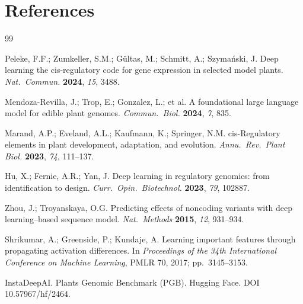 \documentclass[11pt,a4paper]{article}
\begin{document}
\section*{References}
\begin{thebibliography}{99}
\small
\setlength{\itemsep}{2pt}

Peleke, F.F.; Zumkeller, S.M.; G\"ultas, M.; Schmitt, A.; Szyma\'nski, J. Deep learning the cis-regulatory code for gene expression in selected model plants. \emph{Nat.\ Commun.} \textbf{2024}, \emph{15}, 3488.

Mendoza-Revilla, J.; Trop, E.; Gonzalez, L.; et al. A foundational large language model for edible plant genomes. \emph{Commun.\ Biol.} \textbf{2024}, \emph{7}, 835.

Marand, A.P.; Eveland, A.L.; Kaufmann, K.; Springer, N.M. cis-Regulatory elements in plant development, adaptation, and evolution. \emph{Annu.\ Rev.\ Plant Biol.} \textbf{2023}, \emph{74}, 111--137.

Hu, X.; Fernie, A.R.; Yan, J. Deep learning in regulatory genomics: from identification to design. \emph{Curr.\ Opin.\ Biotechnol.} \textbf{2023}, \emph{79}, 102887.

Zhou, J.; Troyanskaya, O.G. Predicting effects of noncoding variants with deep learning--based sequence model. \emph{Nat.\ Methods} \textbf{2015}, \emph{12}, 931--934.

Shrikumar, A.; Greenside, P.; Kundaje, A. Learning important features through propagating activation differences. In \emph{Proceedings of the 34th International Conference on Machine Learning}, PMLR 70, 2017; pp.\ 3145--3153.

InstaDeepAI. Plants Genomic Benchmark (PGB). Hugging Face. DOI 10.57967/hf/2464.

\end{thebibliography}
\end{document}
